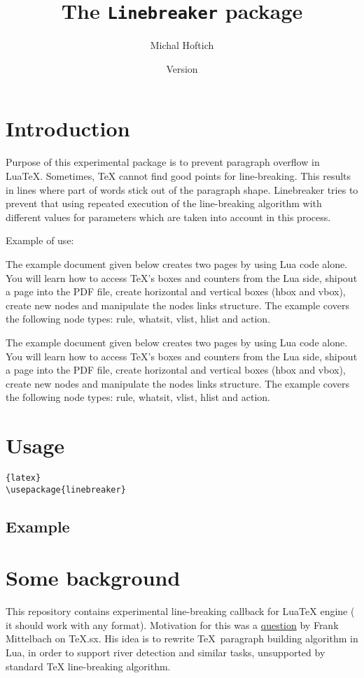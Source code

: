 \documentclass{ltxdoc}
\title{The \texttt{Linebreaker} package}
\author{Michal Hoftich\authormail{michal.h21@gmail.com}}
\date{Version \version\\\gitdate}
\newcommand\testbox[1]{%
  \parbox{150pt}{%
    \parindent=15pt%
    \tolerance=1%
    \pretolerance=1%
    #1
  }%
}
\begin{document}
\maketitle
\tableofcontents

\section{Introduction}

Purpose of this experimental package is to prevent paragraph overflow in
LuaTeX. Sometimes, TeX cannot find good points for line-breaking. This results
in lines where part of words stick out of the paragraph shape. Linebreaker
tries to prevent that using repeated execution of the line-breaking algorithm
with different values for parameters which are taken into account in this
process.


\bigskip
Example of use:
\bigskip

 \linebreakerdisable
 \def\testtext{%
The example document given below creates two pages by using Lua code alone. You
will learn how to access TeX's boxes and counters from the Lua side, shipout a
page into the PDF file, create horizontal and vertical boxes (hbox and vbox),
create new nodes and manipulate the nodes links structure. The example covers
the following node types: rule, whatsit, vlist, hlist and action.
 }
\noindent\testbox{%
  \testtext%
}
\linebreakerenable
\hfill
\testbox{%
  \testtext%
}

\section{Usage}


\begin{lstlisting}{latex}
\usepackage{linebreaker}
\end{lstlisting}


\subsection{Example}


\section{Some background}

This repository contains experimental line-breaking callback for LuaTeX engine (
it should work with any format). Motivation for this was a
\href{http://tex.stackexchange.com/q/200989/2891}{question} by Frank Mittelbach on
TeX.sx. His idea is to rewrite \TeX\ paragraph building algorithm in Lua, in
order to support river detection and similar tasks, unsupported by standard TeX
line-breaking algorithm.
\end{document}
